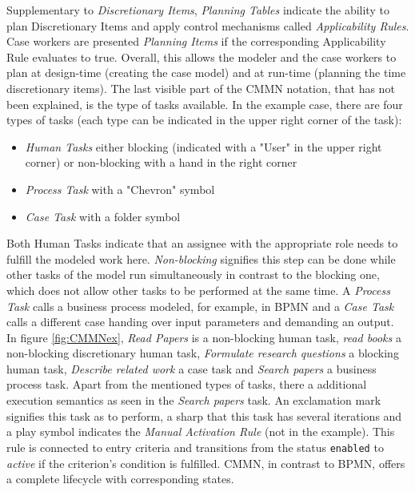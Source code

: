 Supplementary to \textit{Discretionary Items}, \textit{Planning Tables} indicate the ability to plan Discretionary Items and apply control mechanisms called \textit{Applicability Rules}. Case workers are presented \textit{Planning Items} if the corresponding Applicability Rule evaluates to true. Overall, this allows the modeler and the case workers to plan at design-time (creating the case model) and at run-time (planning the time discretionary items). 
The last visible part of the CMMN notation, that has not been explained, is the type of tasks available. In the example case, there are four types of tasks (each type can be indicated in the upper right corner of the task):

\begin{itemize}
\item \textit{Human Tasks} either blocking (indicated with a "User" in the upper right corner) or non-blocking with a hand in the right corner
\item \textit{Process Task} with a "Chevron" symbol 
\item \textit{Case Task} with a folder symbol 
\end{itemize}

Both Human Tasks indicate that an assignee with the appropriate role needs to fulfill the modeled work here. \textit{Non-blocking} signifies this step can be done while other tasks of the model run simultaneously in contrast to the blocking one, which does not allow other tasks to be performed at the same time. A \textit{Process Task} calls a business process modeled, for example, in BPMN and a \textit{Case Task} calls a different case handing over input parameters and demanding an output. \\
In figure \ref{fig:CMMNex}, \textit{Read Papers} is a non-blocking human task, \textit{read books} a non-blocking discretionary human task, \textit{Formulate research questions} a blocking human task, \textit{Describe related work} a case task and \textit{Search papers} a business process task.
Apart from the mentioned types of tasks, there a additional execution semantics as seen in the \textit{Search papers} task. An exclamation mark signifies this task as to perform, a sharp that this task has several iterations and a play symbol indicates the \textit{Manual Activation Rule} (not in the example). This rule is connected to entry criteria and transitions from the status \texttt{enabled} to \textit{active} if the criterion's condition is fulfilled. 
CMMN, in contrast to BPMN, offers a complete lifecycle with corresponding states.

